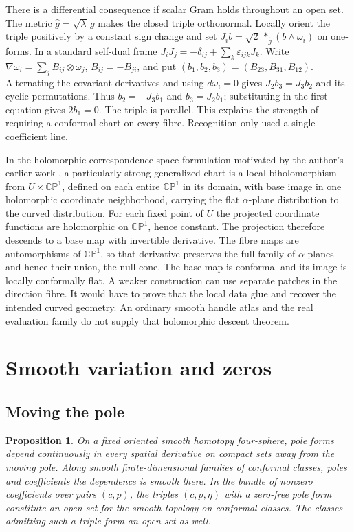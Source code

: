 \documentclass[11pt,letterpaper]{article}
\numberwithin{equation}{section}
\newtheorem{proposition}{Proposition}[section]
\begin{document}
There is a differential consequence if scalar Gram holds throughout
an open set. The metric \(\widehat g=\sqrt{\lambda}\,g\) makes the
closed triple orthonormal. Locally orient the triple positively by a
constant sign change and set \(J_i b=\sqrt2\,*_{\widehat g}(b\wedge
\omega_i)\) on one-forms. In a standard self-dual frame
\(J_iJ_j=-\delta_{ij}+\sum_k\varepsilon_{ijk}J_k\). Write
\(\nabla\omega_i=\sum_j B_{ij}\otimes\omega_j\), \(B_{ij}=-B_{ji}\),
and put \((b_1,b_2,b_3)=(B_{23},B_{31},B_{12})\).
Alternating the covariant derivatives and using \(d\omega_i=0\)
gives \(J_2 b_3=J_3 b_2\) and its cyclic permutations. Thus
\(b_2=-J_3b_1\) and \(b_3=J_2b_1\); substituting in the first
equation gives \(2b_1=0\). The triple is parallel. This explains
the strength of requiring a conformal chart on every fibre.
Recognition only used a single coefficient line.

In the holomorphic correspondence-space formulation
motivated by the author's earlier work \cite{BakerCurved2025,BakerIsothermal2026},
a particularly strong generalized chart is a local biholomorphism
from \(U\times\mathbb{CP}^1\), defined on each entire \(\mathbb{CP}^1\) in its domain,
with base image in one holomorphic coordinate neighborhood, carrying
the flat \(\alpha\)-plane distribution to the curved distribution.
For each fixed point of \(U\) the projected coordinate functions are
holomorphic on \(\mathbb{CP}^1\), hence constant. The projection
therefore descends to a base map with invertible derivative. The
fibre maps are automorphisms of \(\mathbb{CP}^1\), so that derivative
preserves the full family of \(\alpha\)-planes and hence their union,
the null cone. The base map is conformal and its image is locally
conformally flat. A weaker construction can use separate patches in
the direction fibre. It would have to prove that the local data glue
and recover the intended curved geometry. An ordinary smooth handle
atlas and the real evaluation family do not supply that holomorphic
descent theorem.

\section{Smooth variation and zeros}\label{sec:pole-zeros}

\subsection{Moving the pole}

\begin{proposition}\label{prop:pole-openness}
On a fixed oriented smooth homotopy four-sphere, pole forms depend
continuously in every spatial derivative on compact sets away from the
moving pole. Along smooth finite-dimensional families of conformal
classes, poles and coefficients the dependence is smooth there. In the
bundle of nonzero coefficients over pairs \((c,p)\), the triples
\((c,p,\eta)\) with a zero-free pole form constitute an open set for
the smooth topology on conformal classes. The classes admitting such
a triple form an open set as well.
\end{proposition}
\end{document}
